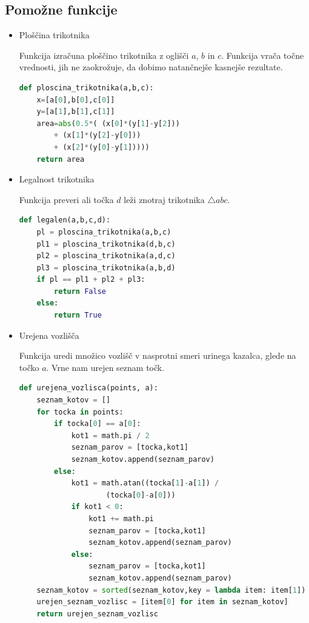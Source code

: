\documentclass[a4, 12pt]{article}
\begin{document}
\subsection{Pomožne funkcije}

\begin{itemize}
	\item Ploščina trikotnika

Funkcija izračuna ploščino trikotnika z oglišči $a$, $b$ in $c$. Funkcija vrača točne vrednosti, jih ne zaokrožuje, da dobimo natančnejše kasnejše rezultate.

\begin{lstlisting}[language=Python]
def ploscina_trikotnika(a,b,c):
    x=[a[0],b[0],c[0]]
    y=[a[1],b[1],c[1]]
    area=abs(0.5*( (x[0]*(y[1]-y[2])) 
		+ (x[1]*(y[2]-y[0])) 
		+ (x[2]*(y[0]-y[1]))))
    return area
\end{lstlisting}

	\item Legalnost trikotnika

Funkcija preveri ali točka $d$ leži znotraj trikotnika  $\triangle abc$.

\newpage

\begin{lstlisting}[language=Python]
def legalen(a,b,c,d):
    pl = ploscina_trikotnika(a,b,c)
    pl1 = ploscina_trikotnika(d,b,c)
    pl2 = ploscina_trikotnika(a,d,c)
    pl3 = ploscina_trikotnika(a,b,d)
    if pl == pl1 + pl2 + pl3:
        return False
    else:
        return True
\end{lstlisting}

	\item Urejena vozlišča

Funkcija uredi množico vozlišč v nasprotni smeri urinega kazalca, glede na točko $a$. Vrne nam urejen seznam točk.

\begin{lstlisting}[language=Python]
def urejena_vozlisca(points, a):
    seznam_kotov = []
    for tocka in points:
        if tocka[0] == a[0]:
            kot1 = math.pi / 2
            seznam_parov = [tocka,kot1]
            seznam_kotov.append(seznam_parov)
        else:
            kot1 = math.atan((tocka[1]-a[1]) / 
					(tocka[0]-a[0]))
            if kot1 < 0:
                kot1 += math.pi
                seznam_parov = [tocka,kot1]
                seznam_kotov.append(seznam_parov)
            else:
                seznam_parov = [tocka,kot1]
                seznam_kotov.append(seznam_parov)   
    seznam_kotov = sorted(seznam_kotov,key = lambda item: item[1])
    urejen_seznam_vozlisc = [item[0] for item in seznam_kotov]
    return urejen_seznam_vozlisc
\end{lstlisting}


\end{itemize}
\end{document}
